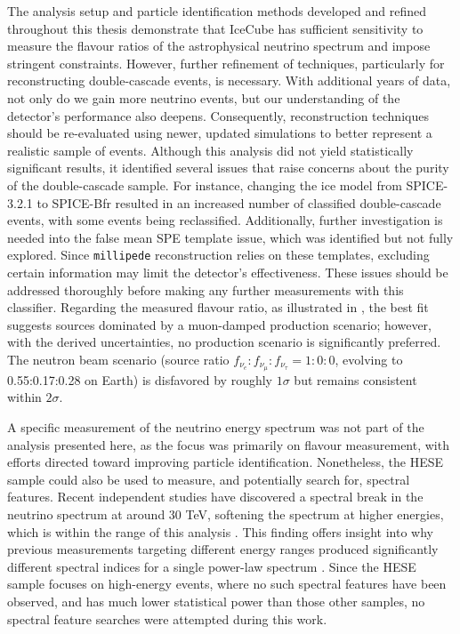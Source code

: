 The analysis setup and particle identification methods developed and refined throughout this thesis demonstrate that IceCube has sufficient sensitivity to measure the flavour ratios of the astrophysical neutrino spectrum and impose stringent constraints. However, further refinement of techniques, particularly for reconstructing double-cascade events, is necessary. With additional years of data, not only do we gain more neutrino events, but our understanding of the detector’s performance also deepens. Consequently, reconstruction techniques should be re-evaluated using newer, updated simulations to better represent a realistic sample of events. Although this analysis did not yield statistically significant results, it identified several issues that raise concerns about the purity of the double-cascade sample. For instance, changing the ice model from SPICE-3.2.1 to SPICE-Bfr resulted in an increased number of classified double-cascade events, with some events being reclassified. Additionally, further investigation is needed into the false mean SPE template issue, which was identified but not fully explored. Since \texttt{millipede} reconstruction relies on these templates, excluding certain information may limit the detector’s effectiveness. These issues should be addressed thoroughly before making any further measurements with this classifier. Regarding the measured flavour ratio, as illustrated in , the best fit suggests sources dominated by a muon-damped production scenario; however, with the derived uncertainties, no production scenario is significantly preferred. The neutron beam scenario (source ratio $f_{\nu_e}:f_{\nu_{\mu}}:f_{\nu_{\tau}} = 1:0:0$, evolving to 0.55:0.17:0.28 on Earth) is disfavored by roughly $1\sigma$ but remains consistent within $2\sigma$.

A specific measurement of the neutrino energy spectrum was not part of the analysis presented here, as the focus was primarily on flavour measurement, with efforts directed toward improving particle identification. Nonetheless, the HESE sample could also be used to measure, and potentially search for, spectral features. Recent independent studies have discovered a spectral break in the neutrino spectrum at around 30 TeV, softening the spectrum at higher energies, which is within the range of this analysis . This finding offers insight into why previous measurements targeting different energy ranges produced significantly different spectral indices for a single power-law spectrum . Since the HESE sample focuses on high-energy events, where no such spectral features have been observed, and has much lower statistical power than those other samples, no spectral feature searches were attempted during this work.

